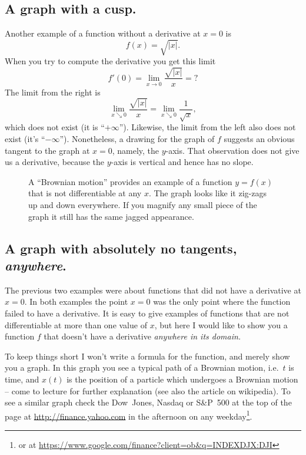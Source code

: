 \subsection{A graph with a cusp. }
Another example of a function without a derivative at $x=0$ is 
\[
f(x) = \sqrt{|x|}.
\]%
%
When you try to compute the derivative you get this limit
\[
f'(0) = \lim_{x\to0} \frac{\sqrt{|x|}}{x} = \text{?}
\]
The limit from the right is
\[
\lim_{x\searrow 0} \frac{\sqrt{|x|}}{x} 
= \lim_{x\searrow 0} \frac1{\sqrt x},
\]
which does not exist (it is ``$+\infty$'').  Likewise, the limit from
the left also does not exist (it's ``$-\infty$'').  Nonetheless, a
drawing for the graph of $f$ suggests an obvious tangent to the graph
at $x=0$, namely, the $y$-axis.  That observation does not give us a
derivative, because the $y$-axis is vertical and hence has no slope.


\begin{figure}
  
  \caption{A ``Brownian motion'' provides an example of a function
    $y=f(x)$ that is not differentiable at any $x$.  The graph
    looks like it zig-zags up and down everywhere.  If you magnify any
    small piece of the graph it still has the same jagged appearance. }
\end{figure}

\subsection{A graph with absolutely no tangents, \emph{anywhere}. }
The previous two examples were about functions that did not have a
derivative at $x=0$.  In both examples the point $x=0$ was the only point
where the function failed to have a derivative.  It is easy to give
examples of functions that are not differentiable at more than one value of
$x$, but here I would like to show you a function $f$ that doesn't have a
derivative \emph{anywhere in its domain.  }


To keep things short I won't write a formula for the function, and merely show
you a graph.  In this graph you see a typical path of a Brownian motion, i.e.\
$t$ is time, and $x(t)$ is the position of a particle which undergoes a Brownian
motion -- come to lecture for further explanation (see also the article on
wikipedia).  To see a similar graph check the Dow~Jones, Nasdaq or S\&P~500 at
the top of the page at \url{http://finance.yahoo.com} in the afternoon on any
weekday\footnote{or at
  \url{https://www.google.com/finance?client=ob&q=INDEXDJX:DJI}}.

